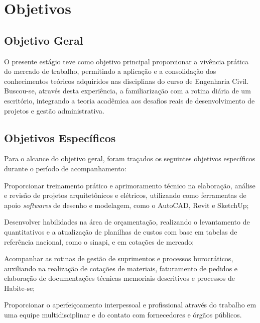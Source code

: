 \chapter[OBJETIVOS]{Objetivos}

\section{Objetivo Geral}

O presente estágio teve como objetivo principal proporcionar a vivência prática do mercado de trabalho, permitindo a aplicação e a consolidação dos conhecimentos teóricos adquiridos nas disciplinas do curso de Engenharia Civil. Buscou-se, através desta experiência, a familiarização com a rotina diária de um escritório, integrando a teoria acadêmica aos desafios reais de desenvolvimento de projetos e gestão administrativa.

\section{Objetivos Específicos}

Para o alcance do objetivo geral, foram traçados os seguintes objetivos específicos durante o período de acompanhamento:

\begin{alineas}
    \item Proporcionar treinamento prático e aprimoramento técnico na elaboração, análise e revisão de projetos arquitetônicos e elétricos, utilizando como ferramentas de apoio \textit{softwares} de desenho e modelagem, como o AutoCAD, Revit e SketchUp;
    \item Desenvolver habilidades na área de orçamentação, realizando o levantamento de quantitativos e a atualização de planilhas de custos com base em tabelas de referência nacional, como o \gls{sinapi}, e em cotações de mercado;
    \item Acompanhar as rotinas de gestão de suprimentos e processos burocráticos, auxiliando na realização de cotações de materiais, faturamento de pedidos e elaboração de documentações técnicas memoriais descritivos e processos de Habite-se;
    \item Proporcionar o aperfeiçoamento interpessoal e profissional através do trabalho em uma equipe multidisciplinar e do contato com fornecedores e órgãos públicos.
\end{alineas}